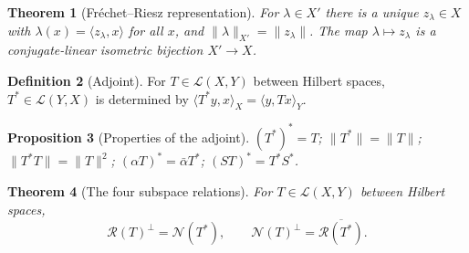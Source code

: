 \documentclass[a4paper]{report}
\theoremstyle{plain}
\newtheorem{theorem}{Theorem}[chapter]
\newtheorem{proposition}[theorem]{Proposition}
\theoremstyle{definition}
\newtheorem{definition}[theorem]{Definition}
\theoremstyle{remark}
\begin{document}
\begin{theorem}[Fr\'echet--Riesz representation]
  \label{thm_frechet_riesz}
  For $\lambda \in X'$ there is a unique $z_\lambda \in X$ with
  $\lambda(x) = \langle z_\lambda, x\rangle$ for all $x$, and
  $\|\lambda\|_{X'} = \|z_\lambda\|$.  The map $\lambda \mapsto z_\lambda$ is a
  conjugate-linear isometric bijection $X' \to X$.
\end{theorem}


\begin{definition}[Adjoint]
  \label{def_adjoint}
  For $T \in \mathcal{L}(X,Y)$ between Hilbert spaces, $T^* \in \mathcal{L}(Y,X)$ is
  determined by $\langle T^*y, x\rangle_X = \langle y, Tx\rangle_Y$.
\end{definition}


\begin{proposition}[Properties of the adjoint]
  \label{prop_adjoint_props}
  $(T^*)^* = T$; $\|T^*\| = \|T\|$; $\|T^*T\| = \|T\|^2$; $(\alpha T)^* = \bar\alpha T^*$;
  $(ST)^* = T^*S^*$.
\end{proposition}


\begin{theorem}[The four subspace relations]
  \label{thm_four_subspaces}
  For $T \in \mathcal{L}(X,Y)$ between Hilbert spaces,
  \[
    \mathcal{R}(T)^\perp = \mathcal{N}(T^*), \qquad
    \mathcal{N}(T)^\perp = \overline{\mathcal{R}(T^*)} .
  \]
\end{theorem}
\end{document}
